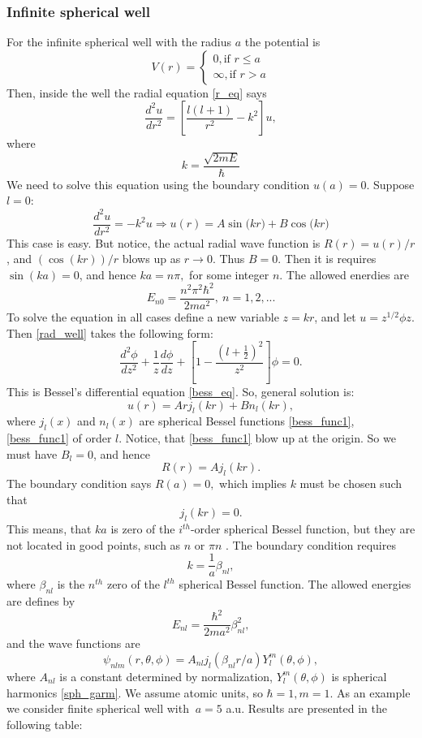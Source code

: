 \documentclass[a4paper, 14pt]{article}
\begin{document}
\subsubsection{Infinite spherical well}
For the infinite spherical well with the radius $a$ the potential is
$$V(r)= \begin{cases}
0, \text{if } r\leq a\\
\infty, \text{if } r>a
\end{cases}$$
Then, inside the well the radial equation \eqref{r_eq} says
\begin{equation}\label{rad_well}
\frac{d^2 u}{dr^2} = [\frac{l(l+1)}{r^2} - k^2]u,
\end{equation}
where
$$k = \frac{\sqrt{2mE}}{\hbar}$$
We need to solve this equation using the boundary condition $u(a) = 0.$
Suppose  $l=0$:
$$\frac{d^2 u}{dr^2} = -k^2 u \Rightarrow u(r) = A \sin{(kr})+B\cos{(kr})$$
This case is easy. But notice, the actual radial wave function is $R(r)= u(r)/r$, and $(\cos (kr))/r$ blows up as  $r \to 0.$ Thus $B =0.$ Then it is requires $\sin (ka) =0$, and hence $ka = n \pi,$ for some integer $n$. The allowed enerdies are
$$E_{n0} = \frac{n^2 \pi^2 \hbar^2}{2 ma^2}, ~ n = 1,2,...$$
To solve the equation in all cases define a new variable $z= k r$, and let  $u = z^{1/2}\phi{z}.$
Then \eqref{rad_well} takes the following form:
$$\frac{d^2 \phi}{dz^2}+\frac{1}{z}\frac{d \phi}{dz}+[1 - \frac{(l+\frac{1}{2})^2}{z^2}]\phi = 0.$$
This is Bessel's differential equation \eqref{bess_eq}. So, general solution is:
$$u(r)=Ar j_l(kr)+Bn_l(kr),$$
where $j_l(x)$ and  $n_l(x)$ are spherical Bessel functions \eqref{bess_func1}, \eqref{bess_func1} of order $l$.
Notice, that  \eqref{bess_func1} blow up at the origin. So we must have $B_l=0$, and hence
$$R(r)=A j_l(kr).$$
The boundary condition says $R(a)=0,$ which implies $k$ must be chosen such that
$$j_l(kr)=0.$$
This means, that $ka$ is zero of the $i^{th}$-order spherical Bessel function, but  they are not located in good points, such as $n$ or $\pi n$ . The boundary condition requires 
$$k = \frac{1}{a}\beta_{nl},$$
where $\beta_{nl}$ is the $n^{th}$ zero of the  $l^{th}$  spherical Bessel function. The allowed energies are defines by
\begin{equation}\label{sol_inf_well}
E_{nl}=\frac{\hbar^2}{2ma^2}\beta_{nl}^2,
\end{equation}
and the wave functions are
$$\psi_{nlm}(r, \theta,\phi) = A_{nl} j_l(\beta_{nl}r/a) Y_l^m(\theta, \phi),$$
where $A_{nl}$ is a constant determined by normalization, $Y_l^m(\theta, \phi)$ is spherical harmonics \eqref{sph_garm}.
We assume atomic units, so $\hbar = 1, m=1.$ As an example we consider finite spherical well with $\ a = 5 $ a.u. Results are presented in the following table: 
\end{document}
